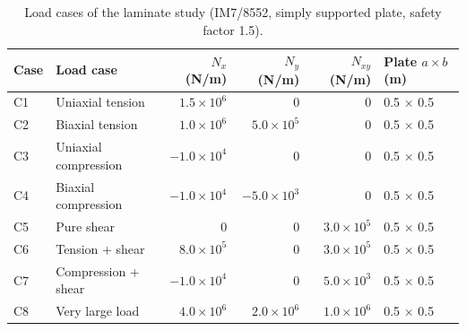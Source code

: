 \begin{table}[htbp]
\centering
\caption{Load cases of the laminate study (IM7/8552, simply supported plate, safety factor 1.5).}
\label{tab:load_cases}
\begin{tabular}{llrrrl}
\toprule
Case & Load case & $N_x$ (N/m) & $N_y$ (N/m) & $N_{xy}$ (N/m) & Plate $a \times b$ (m) \\
\midrule
C1 & Uniaxial tension & $1.5 \times 10^{6}$ & 0 & 0 & 0.5 $\times$ 0.5 \\
C2 & Biaxial tension & $1.0 \times 10^{6}$ & $5.0 \times 10^{5}$ & 0 & 0.5 $\times$ 0.5 \\
C3 & Uniaxial compression & $-1.0 \times 10^{4}$ & 0 & 0 & 0.5 $\times$ 0.5 \\
C4 & Biaxial compression & $-1.0 \times 10^{4}$ & $-5.0 \times 10^{3}$ & 0 & 0.5 $\times$ 0.5 \\
C5 & Pure shear & 0 & 0 & $3.0 \times 10^{5}$ & 0.5 $\times$ 0.5 \\
C6 & Tension + shear & $8.0 \times 10^{5}$ & 0 & $3.0 \times 10^{5}$ & 0.5 $\times$ 0.5 \\
C7 & Compression + shear & $-1.0 \times 10^{4}$ & 0 & $5.0 \times 10^{3}$ & 0.5 $\times$ 0.5 \\
C8 & Very large load & $4.0 \times 10^{6}$ & $2.0 \times 10^{6}$ & $1.0 \times 10^{6}$ & 0.5 $\times$ 0.5 \\
\bottomrule
\end{tabular}
\end{table}
